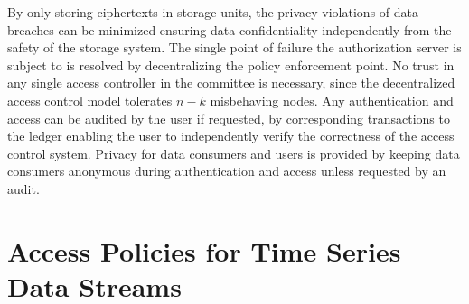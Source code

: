 \documentclass[conference]{IEEEtran}
\begin{document}
By only storing ciphertexts in storage units, the privacy violations of data breaches can be minimized ensuring data confidentiality independently from the safety of the storage system. The single point of failure the authorization server is subject to is resolved by decentralizing the policy enforcement point.
No trust in any single access controller in the committee is necessary, since the decentralized access control model tolerates $n - k$ misbehaving nodes.
Any authentication and access can be audited by the user if requested, by corresponding transactions to the ledger enabling the user to independently verify the correctness of the access control system.
Privacy for data consumers and users is provided by keeping data consumers anonymous during authentication and access unless requested by an audit.

\section{Access Policies for Time Series Data Streams}





\end{document}
